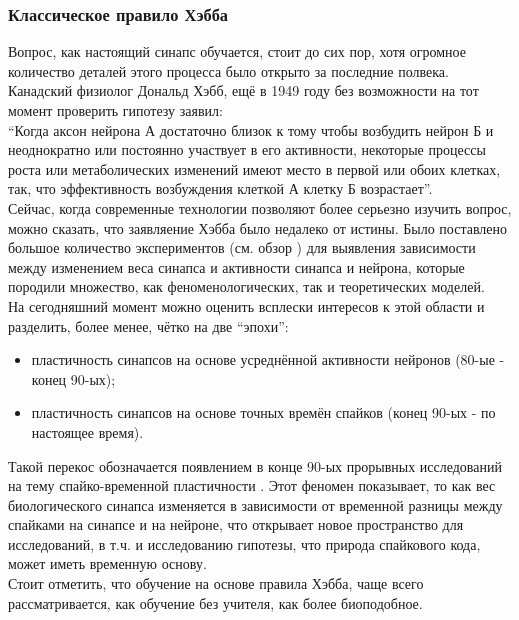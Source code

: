 \documentclass[a4paper,10pt]{article}
\begin{document}
\subsubsection{Классическое правило Хэбба}
\indent Вопрос, как настоящий синапс обучается, стоит до сих пор, хотя огромное количество деталей этого процесса было открыто за последние полвека. Канадский физиолог Дональд Хэбб, ещё в 1949 году без возможности на тот момент проверить гипотезу заявил:\\
\indent ``Когда аксон нейрона А достаточно близок к тому чтобы возбудить нейрон Б и неоднократно или постоянно участвует в его активности, некоторые процессы роста или метаболических изменений имеют место в первой или обоих клетках, так, что эффективность возбуждения клеткой А клетку Б возрастает''\cite{Hebb1949}.\\
\indent Сейчас, когда современные технологии позволяют более серьезно изучить вопрос, можно сказать, что заявляение Хэбба было недалеко от истины. Было поставлено большое количество экспериментов (см. обзор \cite{BiPoo}) для выявления зависимости между изменением веса синапса и активности синапса и нейрона, которые породили множество, как феноменологических, так и теоретических моделей.\\
\indent На сегодняшний момент можно оценить всплески интересов к этой области и разделить, более менее, чётко на две ``эпохи'':
\begin{itemize}
\item пластичность синапсов на основе усреднённой активности нейронов (80-ые - конец 90-ых);
\item пластичность синапсов на основе точных времён спайков (конец 90-ых - по настоящее время).
\end{itemize}

\indent Такой перекос обозначается появлением в конце 90-ых прорывных исследований на тему спайко-временной пластичности \cite{stdp1,stdp2,stdp3,stdp4}. Этот феномен показывает, то как вес биологического синапса изменяется в зависимости от временной разницы между спайками на синапсе и на нейроне, что открывает новое пространство для исследований, в т.ч. и исследованию гипотезы, что природа спайкового кода, может иметь временную основу.\\
\indent Стоит отметить, что обучение на основе правила Хэбба, чаще всего рассматривается, как обучение без учителя, как более биоподобное.\\ 
\end{document}

